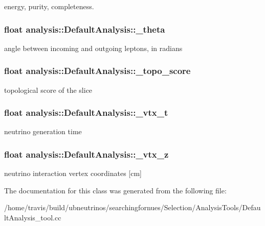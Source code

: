 energy, purity, completeness. \hypertarget{classanalysis_1_1DefaultAnalysis_adb169ccacccada1a17b6699a25f3fd67}{
\subsubsection[{\-\_\-theta}]{\setlength{\rightskip}{0pt plus 5cm}float analysis\-::\-Default\-Analysis\-::\-\_\-theta\hspace{0.3cm}{\ttfamily [private]}}}\label{classanalysis_1_1DefaultAnalysis_adb169ccacccada1a17b6699a25f3fd67}
angle between incoming and outgoing leptons, in radians \hypertarget{classanalysis_1_1DefaultAnalysis_a950efb6f4e8f1ad6dd00e24bc74002c2}{
\subsubsection[{\-\_\-topo\-\_\-score}]{\setlength{\rightskip}{0pt plus 5cm}float analysis\-::\-Default\-Analysis\-::\-\_\-topo\-\_\-score\hspace{0.3cm}{\ttfamily [private]}}}\label{classanalysis_1_1DefaultAnalysis_a950efb6f4e8f1ad6dd00e24bc74002c2}
topological score of the slice \hypertarget{classanalysis_1_1DefaultAnalysis_a39b0367db015ffa41fc4663cb5aeb242}{
\subsubsection[{\-\_\-vtx\-\_\-t}]{\setlength{\rightskip}{0pt plus 5cm}float analysis\-::\-Default\-Analysis\-::\-\_\-vtx\-\_\-t\hspace{0.3cm}{\ttfamily [private]}}}\label{classanalysis_1_1DefaultAnalysis_a39b0367db015ffa41fc4663cb5aeb242}
neutrino generation time \hypertarget{classanalysis_1_1DefaultAnalysis_afd279ca3ddc976b3d509e6c09c0c1514}{
\subsubsection[{\-\_\-vtx\-\_\-z}]{\setlength{\rightskip}{0pt plus 5cm}float analysis\-::\-Default\-Analysis\-::\-\_\-vtx\-\_\-z\hspace{0.3cm}{\ttfamily [private]}}}\label{classanalysis_1_1DefaultAnalysis_afd279ca3ddc976b3d509e6c09c0c1514}
neutrino interaction vertex coordinates \mbox{[}cm\mbox{]} 

The documentation for this class was generated from the following file\-:\begin{DoxyCompactItemize}
\item 
/home/travis/build/ubneutrinos/searchingfornues/\-Selection/\-Analysis\-Tools/Default\-Analysis\-\_\-tool.\-cc\end{DoxyCompactItemize}

